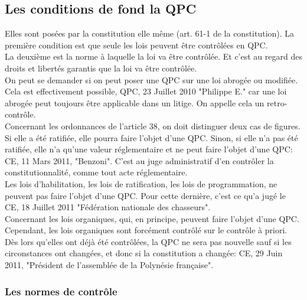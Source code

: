 \documentclass[10pt, a4paper, openany]{book}
\begin{document}
\subsection{Les conditions de fond la QPC}


Elles sont posées par la constitution elle même (art. 61-1 de la constitution). La première condition est que seule les lois peuvent être contrôlées en QPC. \\
La deuxième est la norme à laquelle la loi va être contrôlée. Et c'est au regard des droits et libertés garantis que la loi va être contrôlée. \\
On peut se demander si on peut poser une QPC sur une loi abrogée ou modifiée. Cela est effectivement possible, QPC, 23 Juillet 2010 "Philippe E." car une loi abrogée peut toujours être applicable dans un litige. On appelle cela un retro-contrôle. \\
Concernant les ordonnances de l'article 38, on doit distinguer deux cas de figures. Si elle a été ratifiée, elle pourra faire l'objet d'une QPC. Sinon, si elle n'a pas été ratifiée, elle n'a qu'une valeur réglementaire et ne peut faire l'objet d'une QPC: CE, 11 Mars 2011, "Benzoni". C'est au juge administratif d'en contrôler la constitutionnalité, comme tout acte réglementaire. \\
Les lois d'habilitation, les lois de ratification, les lois de programmation, ne peuvent pas faire l'objet d'une QPC. Pour cette dernière, c'est ce qu'a jugé le CE, 18 Juillet 2011 "Fédération nationale des chasseurs". \\
Concernant les lois organiques, qui, en principe, peuvent faire l'objet d'une QPC. Cependant, les lois organiques sont forcément contrôlé sur le contrôle à priori. Dès lors qu'elles ont déjà été contrôlées, la QPC ne sera pas nouvelle sauf si les circonstances ont changées, et donc si la constitution a changée: CE, 29 Juin 2011, "Président de l'assemblée de la Polynésie française". 

\subsubsection{Les normes de contrôle}
\end{document}

